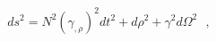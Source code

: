 \begin{equation}
ds^2= N^2 (\gamma_{,\rho})^2 dt^2 + d\rho^2 + \gamma^2 d\Omega^2 \ \ \ , \label{boundaryform}
\end{equation}

